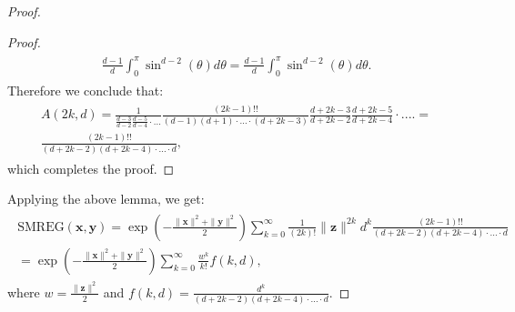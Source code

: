 \begin{proof}
\begin{proof}
\begin{align}
\begin{split}
\frac{d-1}{d}\int_{0}^{\pi}\sin^{d-2}(\theta)d\theta = 
\frac{d-1}{d}\int_{0}^{\pi}\sin^{d-2}(\theta)d\theta.
\end{split}
\end{align}
Therefore we conclude that:
\begin{align}
\begin{split}
A(2k, d) = \frac{1}{\frac{d-3}{d-2}\frac{d-5}{d-4}\cdot ...}
\frac{(2k-1)!!}{(d-1)(d+1)\cdot...\cdot(d+2k-3)}
\frac{d+2k-3}{d+2k-2}\frac{d+2k-5}{d+2k-4} \cdot ....
= \\ \frac{(2k-1)!!}{(d+2k-2)(d+2k-4) \cdot ... \cdot d},
\end{split}
\end{align}
which completes the proof.
\end{proof}
Applying the above lemma, we get:
\begin{align}
\begin{split}
\mathrm{SMREG}(\mathbf{x}, \mathbf{y}) = 
\exp(-\frac{\|\mathbf{x}\|^{2}+\|\mathbf{y}\|^{2}}{2})
\sum_{k=0}^{\infty}\frac{1}{(2k)!}
\|\mathbf{z}\|^{2k}d^{k}\frac{(2k-1)!!}{(d+2k-2)(d+2k-4)\cdot...\cdot d} \\ = 
\exp(-\frac{\|\mathbf{x}\|^{2}+\|\mathbf{y}\|^{2}}{2})
\sum_{k=0}^{\infty} \frac{w^{k}}{k!}f(k, d),
\end{split}
\end{align}
where $w = \frac{\|\mathbf{z}\|^{2}}{2}$
and $f(k, d) = \frac{d^{k}}{(d+2k-2)(d+2k-4)\cdot...\cdot d}$.


\end{proof}
